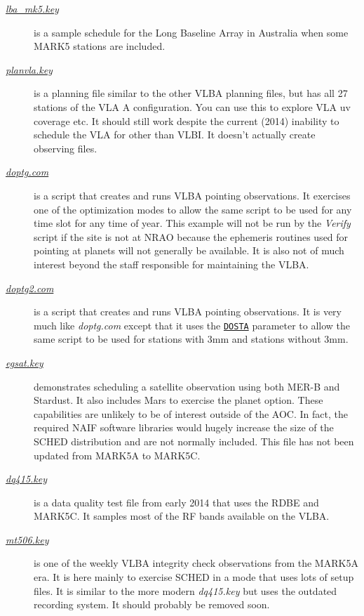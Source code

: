 \documentclass{report}
\begin{document}
\begin{description}
\item[
{\href{examples/lba\_mk5.key}{{\sl lba\_mk5.key}}}] is a
sample schedule for the Long Baseline Array in Australia when some
MARK5 stations are included.

\item[
{\href{examples/planvla.key}{{\sl planvla.key}}}] is a
planning file similar to the other VLBA planning files, but has
all 27 stations of the VLA A configuration.  You can use this to
explore VLA uv coverage etc.  It should still work despite the current
(2014) inability to schedule the VLA for other than VLBI.  It doesn't
actually create observing files.

\item[
{\href{examples/doptg.com}{{\sl doptg.com}}}] is a
script that creates and runs VLBA pointing observations.  It exercises
one of the optimization modes to allow the same script to be used for
any time slot for any time of year.  This example will not be run by
the {\sl Verify} script if the site is not at NRAO because the
ephemeris routines used for pointing at planets will not generally be
available.  It is also not of much interest beyond the staff
responsible for maintaining the VLBA.

\item[
{\href{examples/doptg2.com}{{\sl doptg2.com}}}] is a
script that creates and runs VLBA pointing observations.  It is very
much like {\sl doptg.com} except that it uses the 
{\hyperref[MP:DOSTA]{{\tt DOSTA}}}
parameter to allow the same script to be used for stations
with 3mm and stations without 3mm.

\item[
{\href{examples/egsat.key}{{\sl egsat.key}}}]
demonstrates scheduling a satellite observation using both MER-B and
Stardust.  It also includes Mars to exercise the planet option.  These
capabilities are unlikely to be of interest outside of the AOC.  In
fact, the required NAIF software libraries would hugely increase the
size of the SCHED distribution and are not normally included.  This
file has not been updated from MARK5A to MARK5C.

\item[
{\href{examples/dq415.key}{{\sl dq415.key}}}] is
a data quality test file from early 2014 that uses the RDBE and MARK5C.
It samples most of the RF bands available on the VLBA.

\item[
{\href{examples/mt506.key}{{\sl mt506.key}}}] is one
of the weekly VLBA integrity check observations from the MARK5A era.
It is here mainly to exercise SCHED in a mode that uses lots of setup
files.  It is similar to the more modern {\sl dq415.key} but uses the
outdated recording system.  It should probably be removed soon.


\end{description}
\end{document}
